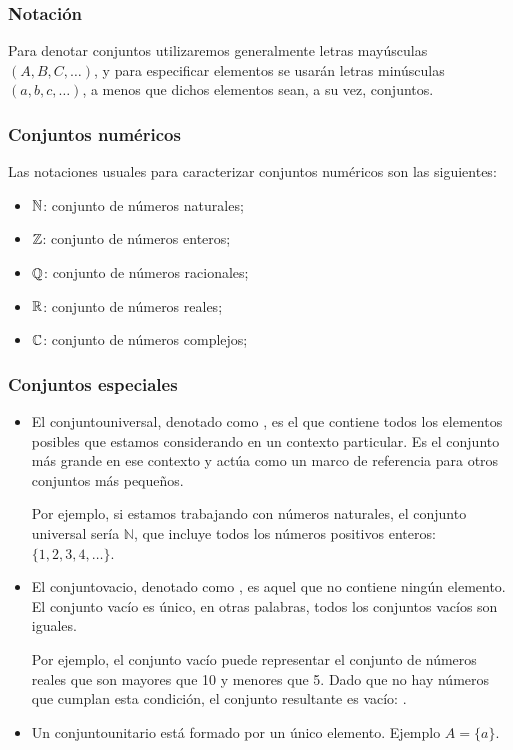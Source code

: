 \subsubsection{Notación}
Para denotar conjuntos utilizaremos generalmente letras mayúsculas $(A, B, C, \ldots)$, y para especificar elementos se usarán letras minúsculas \( (a, b, c, \ldots) \), a menos que dichos elementos sean, a su vez, conjuntos.

\subsubsection{Conjuntos numéricos}

Las notaciones usuales para caracterizar conjuntos numéricos son las siguientes:

\begin{itemize}
	\item $\mathbb{N}$: conjunto de números naturales;
	\item $\mathbb{Z}$: conjunto de números enteros;
	\item $\mathbb{Q}$: conjunto de números racionales;
	\item $\mathbb{R}$: conjunto de números reales;
	\item $\mathbb{C}$: conjunto de números complejos;
\end{itemize}

\subsubsection{Conjuntos especiales}

\begin{itemize}
	\item El \gls{conjuntouniversal},  denotado como , es el que contiene todos los elementos posibles que estamos considerando en un contexto particular. Es el conjunto más grande en ese contexto y actúa como un marco de referencia para otros conjuntos más pequeños.
	
	Por ejemplo, si estamos trabajando con números naturales, el conjunto universal sería \(\mathbb{N}\), que incluye todos los números positivos enteros: \(\{1, 2, 3, 4, \ldots\} \).
	
	\item El \gls{conjuntovacio},   denotado como , es aquel que no contiene ningún elemento. El conjunto vacío es único, en otras palabras, todos los conjuntos vacíos son iguales.
	
	Por ejemplo, el conjunto vacío puede representar el conjunto de números reales que son mayores que 10 y menores que 5. Dado que no hay números que cumplan esta condición, el conjunto resultante es vacío: .
	
	\item Un \gls{conjuntounitario} está formado por un único elemento. Ejemplo $A = \{ a \}$.
\end{itemize}

